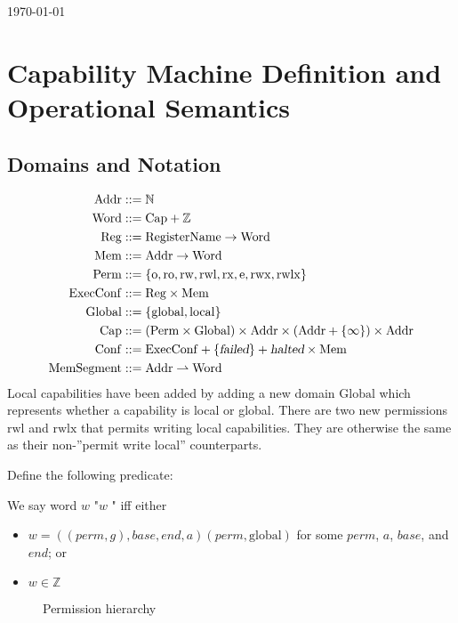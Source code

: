\documentclass[a4paper]{article}
\newcommand{\parfun}{\rightharpoonup}
\newcommand{\var}[1]{\mathit{#1}}
\newcommand{\gl}{\var{g}}
\newcommand{\addr}{\var{a}}
\newcommand{\start}{\var{base}}
\newcommand{\addrend}{\var{end}}
\newcommand{\perm}{\var{perm}}
\newcommand{\stdcap}[1][(\perm,\gl)]{\left(#1,\start,\addrend,\addr \right)}
\newcommand{\failed}{\textsl{failed}}
\newcommand{\halted}{\textsl{halted}}
\newcommand{\plaindom}[1]{\mathrm{#1}}
\newcommand{\Caps}{\plaindom{Cap}}
\newcommand{\Words}{\plaindom{Word}}
\newcommand{\Addrs}{\plaindom{Addr}}
\newcommand{\ExecConfs}{\plaindom{ExecConf}}
\newcommand{\RegName}{\plaindom{RegisterName}}
\newcommand{\Regs}{\plaindom{Reg}}
\newcommand{\Heaps}{\plaindom{Mem}}
\newcommand{\HeapSegments}{\plaindom{MemSegment}}
\newcommand{\Confs}{\plaindom{Conf}}
\newcommand{\nats}{\mathbb{N}}
\newcommand{\ints}{\mathbb{Z}}
\newcommand{\Perms}{\plaindom{Perm}}
\newcommand{\Globals}{\plaindom{Global}}
\newcommand{\plainperm}[1]{\mathrm{#1}}
\newcommand{\noperm}{\plainperm{o}}
\newcommand{\readonly}{\plainperm{ro}}
\newcommand{\readwrite}{\plainperm{rw}}
\newcommand{\exec}{\plainperm{rx}}
\newcommand{\entry}{\plainperm{e}}
\newcommand{\rwx}{\plainperm{rwx}}
\newcommand{\readwritel}{\plainperm{rwl}}
\newcommand{\rwlx}{\plainperm{rwlx}}
\newcommand{\local}{\plainperm{local}}
\newcommand{\glob}{\plainperm{global}}
\newcommand{\nonlocal}[1]{\ensuremath{#1} \text{ is non-local}}
\begin{document}
\begin{flushright}
  \today
\end{flushright}

\tableofcontents

\section{Capability Machine Definition and Operational Semantics}
\subsection{Domains and Notation}

\begin{align*}
  \Addrs &::= \nats\\
  \Words &::= \Caps + \ints \\
  \Regs  &::= \RegName \rightarrow \Words\\
  \Heaps &::= \Addrs \rightarrow \Words \\
  \Perms &::= \{ \noperm, \readonly, \readwrite, \readwritel, \exec, \entry, \rwx, \rwlx\}\\
  \ExecConfs  &::= \Regs \times \Heaps \\
  \Globals & ::= \{\glob, \local \} \\
  \Caps  &::= (\Perms \times \Globals) \times \Addrs \times (\Addrs + \{ \infty \}) \times \Addrs\\
  \Confs &::= \ExecConfs + \{\failed \} + \halted \times \Heaps \\
  \HeapSegments &::= \Addrs \parfun \Words
\end{align*}
Local capabilities have been added by adding a new domain $\Globals$ which represents whether a capability is local or global. There are two new permissions $\readwritel$ and $\rwlx$ that permits writing local capabilities. They are otherwise the same as their non-''permit write local'' counterparts.

Define the following predicate:
\begin{definition}
  \label{def:non-local-cap}
  We say word $w$ "\nonlocal{w}" iff either
  \begin{itemize}
  \item $w = \stdcap{(\perm,\glob)}$ for some $\perm$, $\addr$, $\start$, and $\addrend$; or
  \item $w \in \ints$
  \end{itemize}
\end{definition}

\begin{figure}[!h]
  \centering
  \caption{Permission hierarchy}
  \label{fig:glob-hier}
\end{figure}
\end{document}
